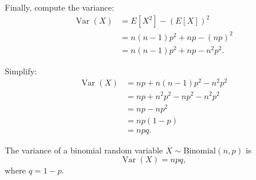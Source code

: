 \bigskip

Finally, compute the variance:
\begin{align*}
  \operatorname{Var}(X) 
&= E[X^2] - (E[X])^2 \\
&= n (n-1) p^2 + n p - (n p)^2 \\
&= n (n-1) p^2 + n p - n^2 p^2.
\end{align*}

\bigskip

Simplify:
\begin{align*}
  \operatorname{Var}(X) 
&= n p + n (n-1) p^2 - n^2 p^2 \\
&= n p + n^2 p^2 - n p^2 - n^2 p^2 \\
&= n p - n p^2 \\
&= n p (1 - p) \\
&= n p q.
\end{align*}

\bigskip

\begin{remark}
  The variance of a binomial random variable \(X \sim \text{Binomial}(n,p)\) is
  \[
    \boxed{
      \operatorname{Var}(X) = n p q,
    }
  \]
  where \(q = 1 - p\).
\end{remark}
